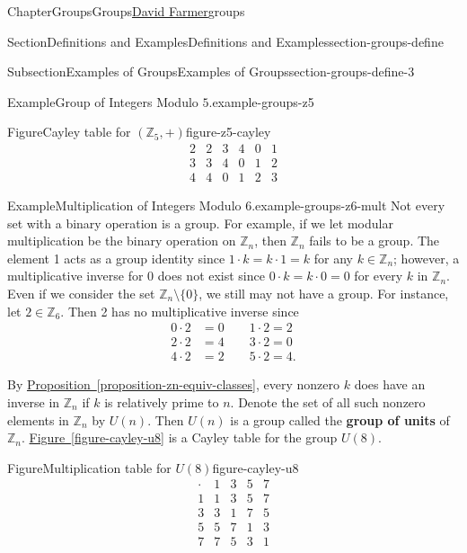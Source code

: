 \documentclass[oneside,10pt,]{book}
\newcommand{\xreffont}{\relax}
\newcommand{\terminology}[1]{\textbf{#1}}
\numberwithin{equation}{section}
\begin{document}
\begin{chapterptx}{Chapter}{Groups}{}{Groups}{\hyperlink{dfarmer}{David Farmer}}{}{groups}
\begin{sectionptx}{Section}{Definitions and Examples}{}{Definitions and Examples}{}{}{section-groups-define}
\begin{subsectionptx}{Subsection}{Examples of Groups}{}{Examples of Groups}{}{}{section-groups-define-3}
\begin{example}{Example}{Group of Integers Modulo \(5\).}{example-groups-z5}
\begin{figureptx}{Figure}{Cayley table for \(({\mathbb Z_5}, +)\)}{figure-z5-cayley}{}
\begin{equation*}
\begin{array}{c|ccccc}
2 & 2 & 3 & 4 & 0 & 1 \\
3 & 3 & 4 & 0 & 1 & 2 \\
4 & 4 & 0 & 1 & 2 & 3
\end{array}
\end{equation*}
%
\tcblower
\end{figureptx}%
\end{example}
\begin{example}{Example}{Multiplication of Integers Modulo \(6\).}{example-groups-z6-mult}%
Not every set with a binary operation is a group.  For example, if we let modular multiplication be the binary operation on \({\mathbb Z}_n\), then \({\mathbb Z}_n\) fails to be a group.  The element 1 acts as a group identity since \(1 \cdot k = k \cdot 1 = k\) for any \(k \in {\mathbb Z}_n\); however, a multiplicative inverse for \(0\) does not exist since \(0 \cdot k = k \cdot 0 = 0\) for every \(k\) in \({\mathbb Z}_n\).  Even if we consider the set \({\mathbb Z}_n \setminus \{0 \}\), we still may not have a group.  For instance, let \(2 \in {\mathbb Z}_6\). Then 2 has no multiplicative inverse since%
\begin{align*}
0 \cdot 2 & = 0 \qquad 1 \cdot 2 = 2\\
2 \cdot 2 & = 4 \qquad 3 \cdot 2 = 0\\
4 \cdot 2 & = 2 \qquad 5 \cdot 2 = 4\text{.}
\end{align*}
%
\par
By \hyperref[proposition-zn-equiv-classes]{Proposition~{\xreffont\ref{proposition-zn-equiv-classes}}}, every nonzero \(k\) does have an inverse in \({\mathbb Z}_n\) if \(k\) is relatively prime to \(n\).  Denote the set of all such nonzero elements in \({\mathbb Z}_n\) by \(U(n)\). \label{example-groups-z6-mult-3-8}  Then \(U(n)\) is a group called the \terminology{group of units} of \({\mathbb Z}_n\).  \hyperref[figure-cayley-u8]{Figure~{\xreffont\ref{figure-cayley-u8}}} is a Cayley table for the group \(U(8)\).%
\begin{figureptx}{Figure}{Multiplication table for \(U(8)\)}{figure-cayley-u8}{}%
\centering
%
\begin{equation*}
\begin{array}{c|cccc}
\cdot & 1 & 3 & 5 & 7 \\
\hline
1       & 1 & 3 & 5 & 7 \\
3       & 3 & 1 & 7 & 5 \\
5       & 5 & 7 & 1 & 3 \\
7       & 7 & 5 & 3 & 1
\end{array}

\end{equation*}
\end{figureptx}
\end{example}
\end{subsectionptx}
\end{sectionptx}
\end{chapterptx}
\end{document}
